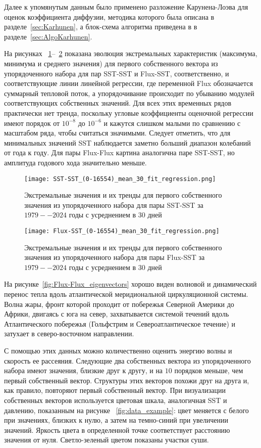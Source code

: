 Далее к упомянутым данным было применено разложение Карунена-Лоэва для оценок коэффициента диффузии, методика которого была описана в разделе~\ref{sec:Karhunen}, а блок-схема алгоритма приведена в в разделе~\ref{sec:AlgoKarhunen}.

На рисунках ~\ref{fig:SST-SST_trends}--~\ref{fig:Flux-SST_trends} показана эволюция экстремальных характеристик (максимума, минимума и среднего значения) для первого собственного вектора из упорядоченного набора для пар SST-SST и Flux-SST, соответственно, и соответствующие линии линейной регрессии, где переменной Flux обозначается суммарный тепловой поток, а упорядочивание происходит по убыванию модулей соответствующих собственных значений. Для всех этих временных рядов практически нет тренда, поскольку угловые коэффициенты оценочной регрессии имеют порядок от $10^{-8}$ до $10^{-6}$ и кажутся слишком малыми по сравнению с масштабом ряда, чтобы считаться значимыми. Следует отметить, что для минимальных значений SST наблюдается заметно больший диапазон колебаний от года к году. Для пары Flux-Flux картина аналогична паре SST-SST, но амплитуда годового хода значительно меньше.

\begin{figure}
	\centering
	\texttt{[image: SST-SST\_(0-16554)\_mean\_30\_fit\_regression.png]}
	\caption{Экстремальные значения и их тренды для первого собственного значения из упорядоченного набора для пары SST-SST за $1979--2024$ годы с усреднением в $30$ дней}
	\label{fig:SST-SST_trends}
\end{figure}

\begin{figure}
	\centering
	\texttt{[image: Flux-SST\_(0-16554)\_mean\_30\_fit\_regression.png]}
	\caption{Экстремальные значения и их тренды для первого собственного значения из упорядоченного набора для пары Flux-SST за $1979--2024$ годы с усреднением в $30$ дней}
	\label{fig:Flux-SST_trends}
\end{figure}

На рисунке~\ref{fig:Flux-Flux_eigenvectors} хорошо виден волновой и динамический перенос тепла вдоль атлантической меридиональной циркуляционной системы. Волна жары, фронт которой проходит от побережья Северной Америки до Африки, двигаясь с юга на север, захватывается системой течений вдоль Атлантического побережья (Гольфстрим и Североатлантическое течение) и затухает в северо-восточном направлении.

С помощью этих данных можно количественно оценить энергию волны и скорость ее рассеяния. Следующие два собственных вектора из упорядоченного набора имеют значения, близкие друг к другу, и на $10$ порядков меньше, чем первый собственный вектор. Структуры этих векторов похожи друг на друга и, как правило, повторяют первый собственный вектор. При визуализации собственных векторов используется цветовая шкала, аналогичная SST и давлению, показанным на рисунке ~\ref{fig:data_example}: цвет меняется с белого при значениях, близких к нулю, а затем на темно-синий при увеличении значений. Яркость цвета в определенной точке соответствует расстоянию значения от нуля. Светло-зеленый цветом показаны участки суши.


